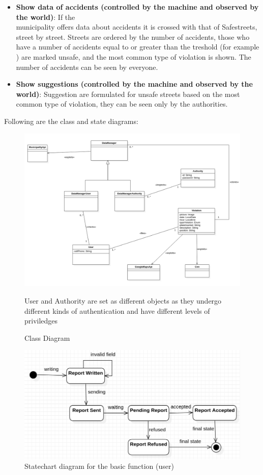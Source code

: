 \begin{itemize}
\item \textbf{Show data of accidents (controlled by the machine and observed by the world)}: If the \\ municipality offers data about accidents it is crossed with that of Safestreets, street by street. Streets are ordered by the number of accidents, those who have a number of accidents equal to or greater than the treshold (for example \textcolor{Red}{\tres}) are marked unsafe, and the most common type of violation is shown. The number of accidents can be seen by everyone.

\item \textbf{Show suggestions (controlled by the machine and observed by the world)}: Suggestion are formulated for unsafe streets based on the most common type of violation, they can be seen only by the authorities.

\end{itemize}

Following are the class and state diagrams: \newpage

\begin{figure}[H]
\centering
\includegraphics[width=\textwidth]{Images/Diagrams/uml.png}
\caption{\label{fig:UML}Class Diagram}
\medskip
\small
User and Authority are set as different objects as they undergo different kinds of authentication and have different levels of priviledges
\end{figure}

\begin{figure} [H]
\centering
\includegraphics[width=\textwidth]{Images/Diagrams/State-1.png}
\caption{\label{fig:State-1}Statechart diagram for the basic function (user)}
\end{figure}

